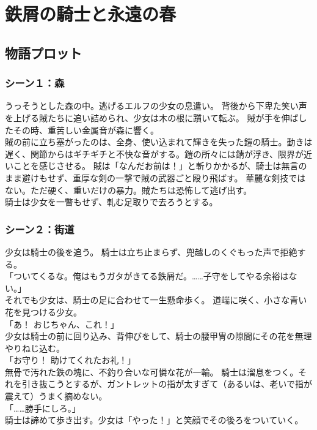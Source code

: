 \chapter{鉄屑の騎士と永遠の春}

\section{物語プロット}
\subsection{シーン１：森}
うっそうとした森の中。逃げるエルフの少女の息遣い。
背後から下卑た笑い声を上げる賊たちに追い詰められ、少女は木の根に躓いて転ぶ。
賊が手を伸ばしたその時、重苦しい金属音が森に響く。\\
賊の前に立ち塞がったのは、全身、使い込まれて輝きを失った鎧の騎士。動きは遅く、関節からはギチギチと不快な音がする。鎧の所々には錆が浮き、限界が近いことを感じさせる。
賊は「なんだお前は！」と斬りかかるが、騎士は無言のまま避けもせず、重厚な剣の一撃で賊の武器ごと殴り飛ばす。
華麗な剣技ではない。ただ硬く、重いだけの暴力。賊たちは恐怖して逃げ出す。\\
騎士は少女を一瞥もせず、軋む足取りで去ろうとする。

\subsection{シーン２：街道}
少女は騎士の後を追う。
騎士は立ち止まらず、兜越しのくぐもった声で拒絶する。
\\「ついてくるな。俺はもうガタがきてる鉄屑だ。……子守をしてやる余裕はない。」\\
それでも少女は、騎士の足に合わせて一生懸命歩く。
道端に咲く、小さな青い花を見つける少女。
\\「あ！ おじちゃん、これ！」\\
少女は騎士の前に回り込み、背伸びをして、騎士の腰甲冑の隙間にその花を無理やりねじ込む。
\\「お守り！ 助けてくれたお礼！」\\
無骨で汚れた鉄の塊に、不釣り合いな可憐な花が一輪。
騎士は溜息をつく。それを引き抜こうとするが、ガントレットの指が太すぎて（あるいは、老いで指が震えて）うまく摘めない。
\\「……勝手にしろ。」\\
騎士は諦めて歩き出す。少女は「やった！」と笑顔でその後ろをついていく。

